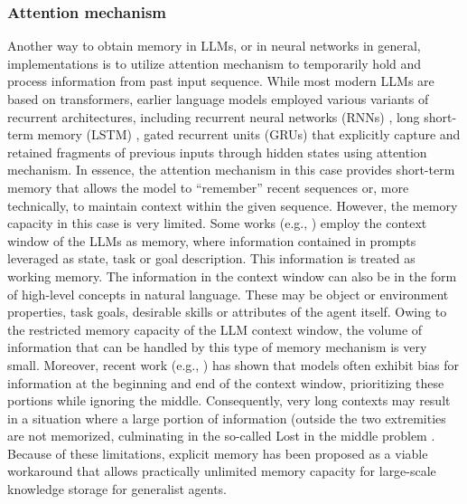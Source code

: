 \documentclass[10pt,journal,compsoc]{IEEEtran}
\begin{document}
	\subsubsection{Attention mechanism}
	Another way to obtain memory in LLMs, or in neural networks in general, implementations is to utilize attention mechanism to temporarily hold and process information from past input sequence.  While most modern LLMs are based on transformers, earlier language models employed various variants of recurrent architectures, including recurrent neural networks (RNNs) \cite{schmidt2019recurrent,mnih2014recurrent}, long short-term memory (LSTM) \cite{graves2012long,van2020review},  gated recurrent units (GRUs) \cite{dey2017gate} that explicitly capture and retained fragments of previous inputs through hidden states using attention mechanism. In essence, the attention mechanism in this case provides short-term memory that allows the model to “remember” recent sequences or, more technically, to maintain context within the given sequence. However, the memory capacity in this case is very limited. 
	Some works (e.g., \cite{hatalis2023memory}) employ the context window of the LLMs as memory, where information contained in prompts leveraged as state, task or goal description. This information is treated as working memory. The information in the context window can also be in the form of high-level concepts in natural language. These may be object or environment properties, task goals, desirable skills or attributes of the agent itself. Owing to the restricted memory capacity of the LLM context window, the volume of information that can be handled by this type of memory mechanism is very small. Moreover, recent work (e.g., \cite{peysakhovich2023attention,hsieh2024found,liu2024lost})  has shown that models often exhibit bias for information at the beginning and end of the context window, prioritizing these portions while ignoring the middle. Consequently, very long contexts may result in a situation where a large portion of information (outside the two extremities are not memorized, culminating in the so-called Lost in the middle problem \cite{liu2024lost}.  Because of these limitations, explicit memory has been proposed as a viable workaround that allows practically unlimited memory capacity for large-scale knowledge storage for generalist agents.  
	
\end{document}
